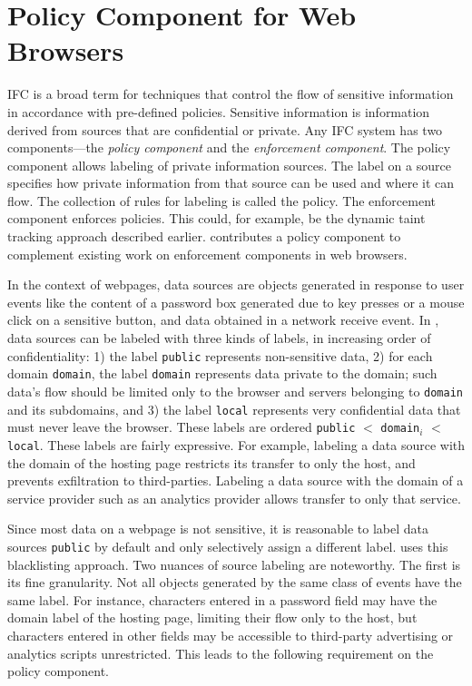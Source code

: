 \section{Policy Component for Web Browsers}
\label{sec:overview}

IFC is a broad term for techniques that control the flow of sensitive
information in accordance with pre-defined policies. Sensitive
information is information derived from sources that are confidential
or private. Any IFC system has two components---the \emph{policy
  component} and the \emph{enforcement component}. The policy
component allows labeling of private information sources. The label on
a source specifies how private information from that source can be
used and where it can flow. The collection of rules for labeling is
called the policy. The enforcement component enforces policies. This
could, for example, be the dynamic taint tracking approach described
earlier. {\sys} contributes a policy component to complement existing
work on enforcement components in web browsers. 

In the context of webpages, data sources are objects generated in
response to user events like the content of a password box generated
due to key presses or a mouse click on a sensitive button, and data
obtained in a network receive event. In {\sys}, data sources can be
labeled with three kinds of labels, in increasing order of
confidentiality: 1) the label \texttt{public} represents non-sensitive
data, 2) for each domain \texttt{domain}, the label \texttt{domain}
represents data private to the domain; such data's flow should be
limited only to the browser and servers belonging to \texttt{domain}
and its subdomains, and 3) the label \texttt{local} represents very
confidential data that must never leave the browser. These labels are
ordered \texttt{public} $<$ \texttt{domain}$_i$ $<$
\texttt{local}. These labels are fairly expressive. For example,
labeling a data source with the domain of the hosting page restricts
its transfer to only the host, and prevents exfiltration to
third-parties. Labeling a data source with the domain of a service
provider such as an analytics provider allows transfer to only that
service. 

Since most data on a webpage is not sensitive, it is reasonable to
label data sources \texttt{public} by default and only selectively
assign a different label. {\sys} uses this blacklisting approach.  Two
nuances of source labeling are noteworthy. The first is its fine
granularity. Not all objects generated by the same class of events
have the same label. For instance, characters entered in a password
field may have the domain label of the hosting page, limiting their
flow only to the host, but characters entered in other fields may be
accessible to third-party advertising or analytics scripts
unrestricted. This leads to the following requirement on the policy
component.

